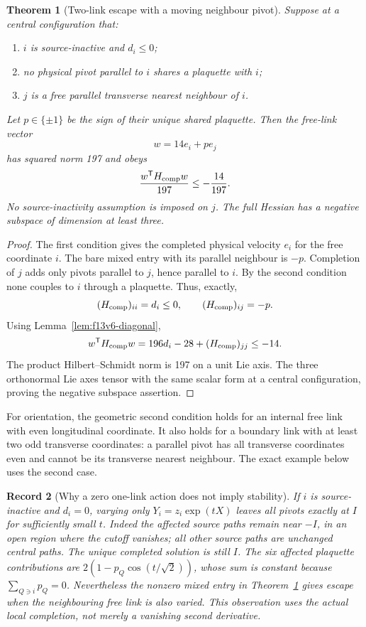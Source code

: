 \documentclass[11pt,oneside]{article}
\newtheorem{theorem}{Theorem}[section]
\newtheorem{record}[theorem]{Record}
\begin{document}
\begin{theorem}[Two-link escape with a moving neighbour pivot]
\label{thm:f13v6-local}
Suppose at a central configuration that:
\begin{enumerate}
\item \(i\) is source-inactive and \(d_i\le0\);
\item no physical pivot parallel to \(i\) shares
a plaquette with \(i\);
\item \(j\) is a free parallel transverse nearest
neighbour of \(i\).
\end{enumerate}
Let \(p\in\{\pm1\}\) be the sign of their unique
shared plaquette. Then the free-link vector
\[
 w=14e_i+p e_j
\]
has squared norm 197 and obeys
\[
 \frac{w^{\mathsf T}H_{\rm comp}w}{197}
 \le-\frac{14}{197}.
\]
No source-inactivity assumption is imposed on \(j\).
The full Hessian has a negative subspace of
dimension at least three.
\end{theorem}

\begin{proof}
The first condition gives the completed physical
velocity \(e_i\) for the free coordinate \(i\).
The bare mixed entry with its parallel neighbour
is \(-p\). Completion of \(j\) adds only pivots
parallel to \(j\), hence parallel to \(i\).
By the second condition none couples to \(i\)
through a plaquette. Thus, exactly,
\[
 (H_{\rm comp})_{ii}=d_i\le0,\qquad
 (H_{\rm comp})_{ij}=-p .
\]
Using Lemma~\ref{lem:f13v6-diagonal},
\[
 w^{\mathsf T}H_{\rm comp}w
 =196d_i-28+(H_{\rm comp})_{jj}
 \le-14 .
\]
The product Hilbert--Schmidt norm is 197 on
a unit Lie axis. The three orthonormal Lie
axes tensor with the same scalar form at a
central configuration, proving the negative
subspace assertion.
\end{proof}

For orientation, the geometric second condition
holds for an internal free link with even
longitudinal coordinate. It also holds for a
boundary link with at least two odd transverse
coordinates: a parallel pivot has all transverse
coordinates even and cannot be its transverse
nearest neighbour. The exact example below
uses the second case.

\begin{record}[Why a zero one-link action does not imply stability]
If \(i\) is source-inactive and \(d_i=0\), varying
only \(Y_i=z_i\exp(tX)\) leaves all pivots exactly
at \(I\) for sufficiently small \(t\). Indeed
the affected source paths remain near \(-I\),
in an open region where the cutoff vanishes;
all other source paths are unchanged central
paths. The unique completed solution is still
\(I\). The six affected plaquette contributions
are \(2(1-p_Q\cos(t/\sqrt2))\), whose sum is
constant because \(\sum_{Q\ni i}p_Q=0\).
Nevertheless the nonzero mixed entry in
Theorem~\ref{thm:f13v6-local} gives escape when
the neighbouring free link is also varied.
This observation uses the actual local completion,
not merely a vanishing second derivative.
\end{record}
\end{document}
